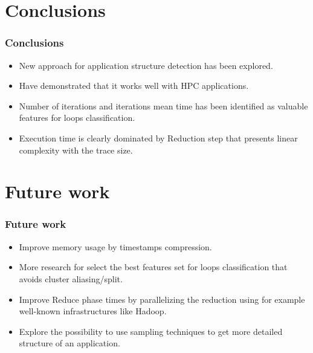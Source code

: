 \documentclass{beamer}
\begin{document}

\section{Conclusions}
\begin{frame}
\frametitle{Conclusions}
\begin{itemize}[<+->]
	\vfill\item New approach for application structure detection has been explored.
	\vfill\item Have demonstrated that it works well with HPC applications.
	\vfill\item Number of iterations and iterations mean time has been identified as valuable features for loops classification.
	\vfill\item Execution time is clearly dominated by Reduction step that presents linear complexity with the trace size.
\end{itemize}
\end{frame}

\section{Future work}
\begin{frame}
	\frametitle{Future work}
	\begin{itemize}[<+->]
		\vfill\item Improve memory usage by timestamps compression.
		\vfill\item More research for select the best features set for loops classification that avoids cluster aliasing/split.
		\vfill\item Improve Reduce phase times by parallelizing the reduction using for example well-known infrastructures like Hadoop.
		\vfill\item Explore the possibility to use sampling techniques to get more detailed structure of an application.
		
	\end{itemize}
\end{frame}
\end{document}
